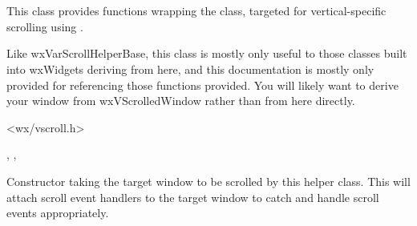 
\section{}\label{wxvarvscrollhelper}

This class provides functions wrapping the 
 class, targeted for
vertical-specific scrolling using .

Like wxVarScrollHelperBase, this class is mostly only useful to those classes
built into wxWidgets deriving from here, and this documentation is mostly
only provided for referencing those functions provided. You will likely want
to derive your window from wxVScrolledWindow rather than from here directly.




<wx/vscroll.h>




,
\rtfsp{},
\rtfsp{}



\label{wxvarvscrollhelperwxvarvscrollhelper}


Constructor taking the target window to be scrolled by this helper class.
This will attach scroll event handlers to the target window to catch and
handle scroll events appropriately.


\label{wxvarvscrollhelperestimatetotalheight}

